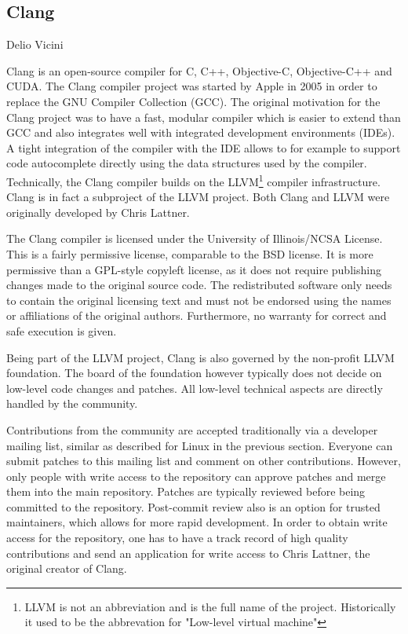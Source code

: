 \subsection{Clang}{Delio Vicini}

Clang is an open-source compiler for C, C++, Objective-C, Objective-C++ and CUDA. The Clang compiler project was started by Apple in 2005 in order to replace the GNU Compiler Collection (GCC). The original motivation for the Clang project was to have a fast, modular compiler which is easier to extend
than GCC and also integrates well with integrated development environments (IDEs).\cite{clang-motivation} A tight integration of the compiler with the IDE allows to for example to support code autocomplete directly using the data structures used by the compiler. Technically, the Clang compiler builds on the LLVM\footnote{LLVM is not an abbreviation and is the full name of the project. Historically it used to be the abbrevation for "Low-level virtual machine"} compiler infrastructure. Clang is in fact a subproject of the LLVM project. Both Clang and LLVM were originally developed by Chris Lattner.\cite{lattner}

The Clang compiler is licensed under the University of Illinois/NCSA License.\cite{clang-policy} This is a fairly permissive license, comparable to the BSD license. It is more permissive than a GPL-style copyleft license, as it does not require publishing changes made to the original source code. The redistributed software only needs to contain the original licensing text and must 
not be endorsed using the names or affiliations of the original authors. Furthermore, no warranty for correct and safe execution is given.\cite{illinois-license}

Being part of the LLVM project, Clang is also governed by the non-profit LLVM foundation.\cite{llvm-foundation} The board of the foundation however typically does not decide on low-level code changes and patches. All low-level technical aspects are directly handled by the community.\cite{clang-policy}

Contributions from the community are accepted traditionally via a developer mailing list, similar as described for Linux in the previous section. Everyone can submit patches to this mailing list and comment on other contributions. However, only people with write access to the repository can approve patches and merge them into the main repository. Patches are typically reviewed before being committed to the repository. Post-commit review also is an option for trusted maintainers, which allows for more rapid development. In order to obtain write access for the repository, one has to have a track record of high quality contributions and send an application for write access to Chris Lattner, the original creator of Clang.

